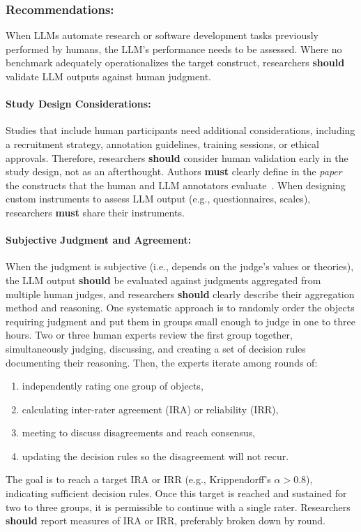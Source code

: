 \documentclass[smallextended]{svjour3}
\newcommand{\must}{\textbf{must}\xspace}
\newcommand{\should}{\textbf{should}\xspace}
\newcommand{\paper}{\emph{paper}\xspace}
\newcommand{\paper}{\emph{paper}\xspace}
\newcommand{\guidelinesubsubsection}[1]{\subsubsection{\bfseries #1:}}
\newcommand{\guidelinesubsubsection}[1]{\subsubsection{#1}}
\begin{document}
\guidelinesubsubsection{Recommendations}

When LLMs automate research or software development tasks previously performed by humans, the LLM's performance needs to be assessed.
Where no benchmark adequately operationalizes the target construct, researchers \should validate LLM outputs against human judgment.

\paragraph{Study Design Considerations:}
Studies that include human participants need additional considerations, including a recruitment strategy, annotation guidelines, training sessions, or ethical approvals.
Therefore, researchers \should consider human validation early in the study design, not as an afterthought.
Authors \must clearly define in the \paper the constructs that the human and LLM annotators evaluate~\cite{DBLP:conf/ease/RalphT18}.
When designing custom instruments to assess LLM output (e.g., questionnaires, scales), researchers \must share their instruments.

\paragraph{Subjective Judgment and Agreement:}
When the judgment is subjective (i.e., depends on the judge's values or theories), the LLM output \should be evaluated against judgments aggregated from multiple human judges, and researchers \should clearly describe their aggregation method and reasoning. One systematic approach is to randomly order the objects requiring judgment and put them in groups small enough to judge in one to three hours. Two or three human experts review the first group together, simultaneously judging, discussing, and creating a set of decision rules documenting their reasoning. Then, the experts iterate among rounds of:
\begin{enumerate}
    \item independently rating one group of objects,
    \item calculating inter-rater agreement (IRA) or reliability (IRR),
    \item meeting to discuss disagreements and reach consensus,
    \item updating the decision rules so the disagreement will not recur.
\end{enumerate}

The goal is to reach a target IRA or IRR (e.g., Krippendorff's $\alpha>0.8$), indicating sufficient decision rules. Once this target is reached and sustained for two to three groups, it is permissible to continue with a single rater.
Researchers \should report measures of IRA or IRR, preferably broken down by round.
\end{document}
